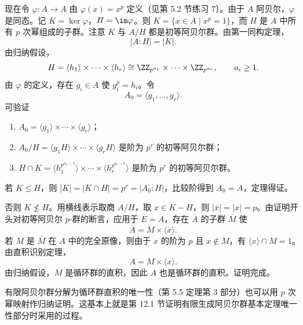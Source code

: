 现在令 $\varphi:A\to A$ 由 $\varphi(x)=x^p$ 定义（见第 5.2 节练习 7）。由于 $A$ 阿贝尔，$\varphi$ 是同态。记 $K=\ker\varphi$，$H=\im\varphi$。则 $K=\{x\in A\mid x^p=1\}$，而 $H$ 是 $A$ 中所有 $p$ 次幂组成的子群。注意 $K$ 与 $A/H$ 都是初等阿贝尔群。由第一同构定理，
\[
  |A:H|=|K|.
\]
由归纳假设，
\[
  H=\langle h_1\rangle\times\cdots\times\langle h_r\rangle
  \cong \ZZ_{p^{a_1}}\times\cdots\times\ZZ_{p^{a_r}},
  \qquad a_i\geq 1.
\]
由 $\varphi$ 的定义，存在 $g_i\in A$ 使 $g_i^p=h_i$。令
\[
  A_0=\langle g_1,\ldots,g_r\rangle.
\]
可验证
\begin{enumerate}[label=(\alph*)]
  \item $A_0=\langle g_1\rangle\times\cdots\times\langle g_r\rangle$；
  \item $A_0/H=\langle g_1H\rangle\times\cdots\times\langle g_rH\rangle$ 是阶为 $p^r$ 的初等阿贝尔群；
  \item $H\cap K=\langle h_1^{p^{a_1-1}}\rangle\times\cdots\times\langle h_r^{p^{a_r-1}}\rangle$ 是阶为 $p^r$ 的初等阿贝尔群。
\end{enumerate}
若 $K\leq H$，则 $|K|=|K\cap H|=p^r=|A_0:H|$，比较阶得到 $A_0=A$，定理得证。

否则 $K\nleq H$。用横线表示取商 $A/H$，取 $x\in K-H$，则 $|\overline x|=|x|=p$。由证明开头对初等阿贝尔 $p$-群的断言，应用于 $\overline E=\overline A$，存在 $\overline A$ 的子群 $\overline M$ 使
\[
  \overline A=\overline M\times\langle\overline x\rangle.
\]
若 $M$ 是 $\overline M$ 在 $A$ 中的完全原像，则由于 $x$ 的阶为 $p$ 且 $x\notin M$，有 $\langle x\rangle\cap M=1$。由直积识别定理，
\[
  A=M\times\langle x\rangle.
\]
由归纳假设，$M$ 是循环群的直积，因此 $A$ 也是循环群的直积。证明完成。

有限阿贝尔群分解为循环群直积的唯一性（第 5.5 定理第 3 部分）也可以用 $p$ 次幂映射作归纳证明。这基本上就是第 12.1 节证明有限生成阿贝尔群基本定理唯一性部分时采用的过程。

